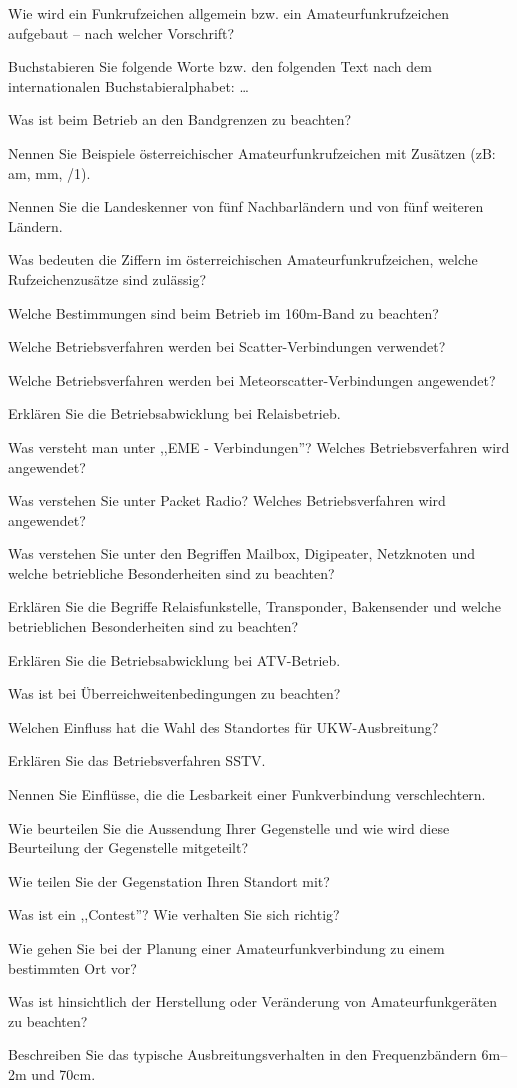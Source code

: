 \documentclass[avery5371,grid,frame,a4paper]{flashcards}
\newcommand\question[2]{
  \begin{flashcard}[{\chap} -- #1]{#2}\end{flashcard}
}
\newcommand\class[1]{{\footnotesize [Klassen: #1]}}
\begin{document}
\question{50}{Wie wird ein Funkrufzeichen allgemein bzw. ein Amateurfunkrufzeichen aufgebaut – nach welcher Vorschrift?}
\question{51}{Buchstabieren Sie folgende Worte bzw. den folgenden Text nach dem internationalen Buchstabieralphabet: \dots}
\question{52}{Was ist beim Betrieb an den Bandgrenzen zu beachten?}
\question{53}{Nennen Sie Beispiele österreichischer Amateurfunkrufzeichen mit Zusätzen (zB: am, mm, /1).}
\question{54}{Nennen Sie die Landeskenner von fünf Nachbarländern und von fünf weiteren Ländern.}
\question{55}{Was bedeuten die Ziffern im österreichischen Amateurfunkrufzeichen, welche Rufzeichenzusätze sind zulässig?}
\question{56}{Welche Bestimmungen sind beim Betrieb im 160m-Band zu beachten?}
\question{57}{Welche Betriebsverfahren werden bei Scatter-Verbindungen verwendet?}
\question{58}{Welche Betriebsverfahren werden bei Meteorscatter-Verbindungen angewendet?}
\question{59}{Erklären Sie die Betriebsabwicklung bei Relaisbetrieb.}
\question{60}{Was versteht man unter ,,EME - Verbindungen''? Welches Betriebsverfahren wird angewendet?}
\question{61}{Was verstehen Sie unter Packet Radio? Welches Betriebsverfahren wird angewendet?}
\question{62}{Was verstehen Sie unter den Begriffen Mailbox, Digipeater, Netzknoten und welche betriebliche Besonderheiten sind zu beachten?}
\question{63}{Erklären Sie die Begriffe Relaisfunkstelle, Transponder, Bakensender und welche betrieblichen Besonderheiten sind zu beachten?}
\question{64}{Erklären Sie die Betriebsabwicklung bei ATV-Betrieb.}
\question{65}{Was ist bei Überreichweitenbedingungen zu beachten?}
\question{66}{Welchen Einfluss hat die Wahl des Standortes für UKW-Ausbreitung?}
\question{67}{Erklären Sie das Betriebsverfahren SSTV.}
\question{68}{Nennen Sie Einflüsse, die die Lesbarkeit einer Funkverbindung verschlechtern.}
\question{69}{Wie beurteilen Sie die Aussendung Ihrer Gegenstelle und wie wird diese Beurteilung der Gegenstelle mitgeteilt?}
\question{70}{Wie teilen Sie der Gegenstation Ihren Standort mit?}
\question{71}{Was ist ein ,,Contest''? Wie verhalten Sie sich richtig?}
\question{72}{Wie gehen Sie bei der Planung einer Amateurfunkverbindung zu einem bestimmten Ort vor?}
\question{73}{Was ist hinsichtlich der Herstellung oder Veränderung von Amateurfunkgeräten zu beachten?}
\question{74}{Beschreiben Sie das typische Ausbreitungsverhalten in den Frequenzbändern 6m--2m und 70cm.}

\def\chap{Betrieb und Fertigkeiten \class{3}}
\end{document}
